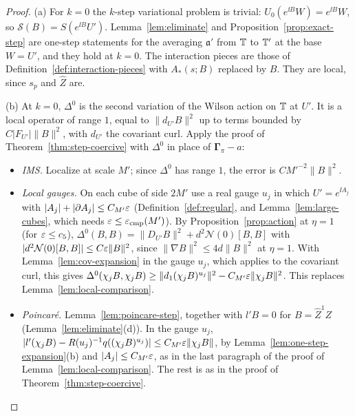 \begin{proof}
(a) For $k=0$ the $k$-step variational problem is trivial: $U_0(e^{\ii B}W)=e^{\ii B}W$, so $\mathcal S(B)=S(e^{\ii B}U')$. Lemma~\ref{lem:eliminate} and Proposition~\ref{prop:exact-step} are one-step statements for the averaging $\mathfrak a'$ from $\mathbb T$ to $\mathbb T'$ at the base $W=U'$, and they hold at $k=0$. The interaction pieces are those of Definition~\ref{def:interaction-pieces} with $A_*(s;B)$ replaced by $B$. They are local, since $s_p$ and $\hat Z$ are.

(b) At $k=0$, $\Delta^0$ is the second variation of the Wilson action on $\mathbb T$ at $U'$. It is a local operator of range $1$, equal to $\|d_{U'}B\|^2$ up to terms bounded by $C|F_{U'}|\|B\|^2$, with $d_{U'}$ the covariant curl. Apply the proof of Theorem~\ref{thm:step-coercive} with $\Delta^0$ in place of $\boldsymbol\Gamma_\pi-a$:
\begin{itemize}
\item \emph{IMS.} Localize at scale $M'$; since $\Delta^0$ has range $1$, the error is $CM'^{-2}\|B\|^2$.
\item \emph{Local gauges.} On each cube of side $2M'$ use a real gauge $u_j$ in which $U'=e^{\ii A_j}$ with $|A_j|+|\partial A_j|\le C_{M'}\varepsilon$ (Definition~\ref{def:regular}, and Lemma~\ref{lem:large-cubes}, which needs $\varepsilon\le\varepsilon_{\rm cmp}(M')$). By Proposition~\ref{prop:action} at $\eta=1$ (for $\varepsilon\le c_5$), $\Delta^0(B,B)=\|D_{U'}B\|^2+d^2\mathcal N(0)[B,B]$ with $|d^2\mathcal N(0)[B,B]|\le C\varepsilon\|B\|^2$, since $\|\nabla B\|^2\le4d\|B\|^2$ at $\eta=1$. With Lemma~\ref{lem:cov-expansion} in the gauge $u_j$, which applies to the covariant curl, this gives $\Delta^0(\chi_jB,\chi_jB)\ge\|d_1(\chi_jB)^{u_j}\|^2-C_{M'}\varepsilon\|\chi_jB\|^2$. This replaces Lemma~\ref{lem:local-comparison}.
\item \emph{Poincar\'e.} Lemma~\ref{lem:poincare-step}, together with $l'B=0$ for $B=\hat Z^1Z$ (Lemma~\ref{lem:eliminate}(d)). In the gauge $u_j$, $|l'(\chi_jB)-R(u_j)^{-1}q((\chi_jB)^{u_j})|\le C_{M'}\varepsilon\|\chi_jB\|$, by Lemma~\ref{lem:one-step-expansion}(b) and $|A_j|\le C_{M'}\varepsilon$, as in the last paragraph of the proof of Lemma~\ref{lem:local-comparison}. The rest is as in the proof of Theorem~\ref{thm:step-coercive}.
\end{itemize}

\end{proof}
